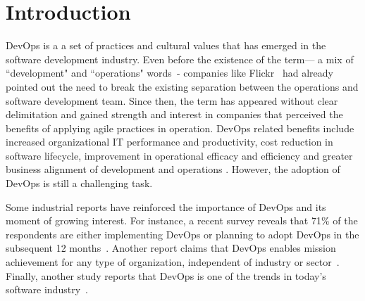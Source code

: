 \section{Introduction}

DevOps is a a set of practices and cultural values that has emerged in the
software development industry. Even before
the existence of the term--- a mix of ``development" and ``operations"
words~\cite{httermann2012devops}- companies like Flickr~\cite{flickr}
had already pointed out the need to break the existing separation between
the operations and software development team. Since then, the term
has appeared without clear delimitation and gained strength and interest
in companies that perceived the benefits of applying agile practices in
operation. DevOps related benefits include increased organizational IT
performance and productivity, cost reduction in software lifecycle, improvement
in operational efficacy and efficiency and greater business alignment of
development and operations \cite{}.
However, the adoption of DevOps is still a challenging
task.


Some industrial reports have reinforced the importance of DevOps and its moment
of growing interest. For instance, a recent survey reveals
that 71\% of the respondents are either implementing DevOps or
planning to adopt DevOps in the subsequent 12 months~\cite{state_of_agile}.
Another report claims that DevOps enables mission achievement
for any type of organization, independent of industry or sector~\cite{state_of_devops}.
Finally, another study reports that DevOps is one of the trends in
today's software industry~\cite{stackoverflow_2018}.

